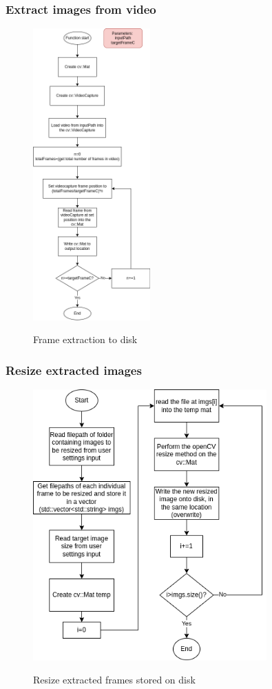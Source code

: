 \documentclass[11pt]{report}
\begin{document}
\subsubsection{Extract images from video}
\begin{figure}[h!]
	\centering
	\caption{Frame extraction to disk}
	\includegraphics[width=0.4\textwidth]{designDiagrams/extractFrames}
	\label{fig:extractFrames}
\end{figure}
\newpage
\subsubsection{Resize extracted images}
\begin{figure}[h!]
	\centering
	\caption{Resize extracted frames stored on disk}
	\includegraphics[width=0.8\textwidth]{designDiagrams/resizeImages}
	\label{fig:resizeImages}
\end{figure}
\end{document}
